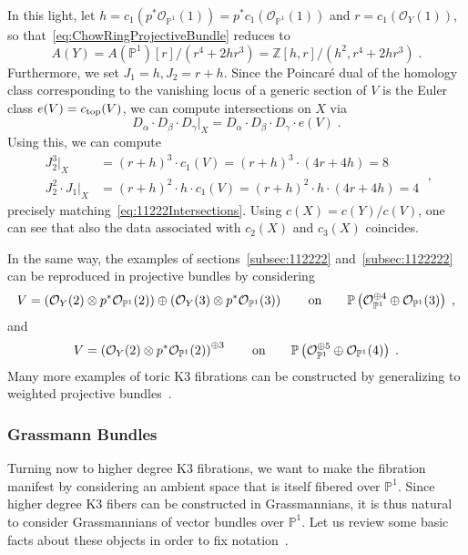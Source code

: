 \documentclass[11pt,a4paper]{article}
\numberwithin{equation}{section}
\numberwithin{table}{section}\setlength{\multlinegap}{25pt}
\begin{document}
In this light, let $h=c_1(p^* \mathcal{O}_{\mathbb{P}^1}(1))=p^*c_1(\mathcal{O}_{\mathbb{P}^1}(1))$ and $r=c_1(\mathcal{O}_Y(1))$, so that~\eqref{eq:ChowRingProjectiveBundle} reduces to 
\begin{equation}
    A(Y)=A(\mathbb{P}^1)[r]/\left(r^4+2hr^3\right)=\mathbb{Z}[h,r]/\left(h^2,r^4+2hr^3\right)\;.
\end{equation}
Furthermore, we set $J_1=h,J_2=r+h$. Since the Poincaré dual of the homology class corresponding to the vanishing locus of a generic section of $V$ is the Euler class $e(V)=c_\textup{top}(V)$, we can compute intersections on $X$ via
\begin{equation}
    \label{eq:IntersectionFromAmbietEulerClass}
    D_\alpha\cdot D_\beta\cdot D_\gamma|_X=D_\alpha\cdot D_\beta\cdot D_\gamma\cdot e(V)\;.
\end{equation}
Using this, we can compute
\begin{equation}
    \begin{aligned}
        J_2^3|_X&=(r+h)^3\cdot c_1(V)=(r+h)^3\cdot(4r+4h)=8\\
        J_2^2\cdot J_1|_X&=(r+h)^2\cdot h\cdot c_1(V)=(r+h)^2\cdot h\cdot(4r+4h)=4
    \end{aligned}\;,
\end{equation}
precisely matching~\eqref{eq:11222Intersections}. Using $c(X)=c(Y)/c(V)$, one can see that also the data associated with $c_2(X)$ and $c_3(X)$ coincides.

In the same way, the examples of sections~\ref{subsec:112222} and~\ref{subsec:1122222} can be reproduced in projective bundles by considering
\begin{equation}
    V=\left(\mathcal{O}_Y(2)\otimes p^* \mathcal{O}_{\mathbb{P}^1}(2)\right)\oplus\left(\mathcal{O}_Y(3)\otimes p^* \mathcal{O}_{\mathbb{P}^1}(3)\right)\qquad\textup{on}\qquad\mathbb{P}\left(\mathcal{O}_{\mathbb{P}^1}^{\oplus 4}\oplus\mathcal{O}_{\mathbb{P}^1}(3)\right)\;,
\end{equation}
and
\begin{equation}
    V=\left(\mathcal{O}_Y(2)\otimes p^* \mathcal{O}_{\mathbb{P}^1}(2)\right)^{\oplus 3}\qquad\textup{on}\qquad\mathbb{P}\left(\mathcal{O}_{\mathbb{P}^1}^{\oplus 5}\oplus\mathcal{O}_{\mathbb{P}^1}(4)\right)\;.
\end{equation}
Many more examples of toric K3 fibrations can be constructed by generalizing to weighted projective bundles~\cite{mullet2006toric,mullet_thesis}.


\subsubsection*{Grassmann Bundles}
Turning now to higher degree K3 fibrations, we want to make the fibration manifest by considering an ambient space that is itself fibered over $\mathbb{P}^1$. Since higher degree K3 fibers can be constructed in Grassmannians, it is thus natural to consider Grassmannians of vector bundles over $\mathbb{P}^1$. Let us review some basic facts about these objects in order to fix notation~\cite{eisenbud_harris_2016,fulton2016intersection}.
\end{document}
